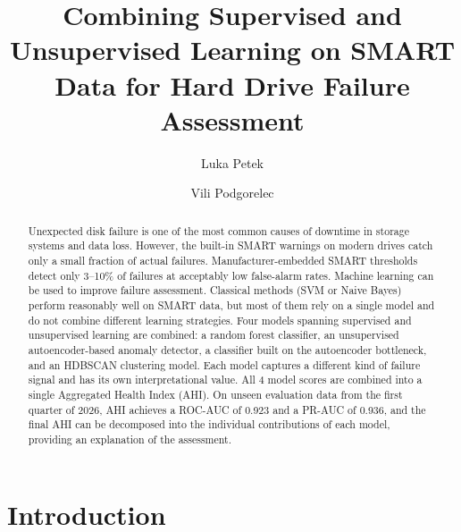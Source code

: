 \documentclass[sigconf,natbib=false]{acmart}
\begin{document}
\title[Combining Supervised and Unsupervised Learning for Hard Drive Failure Assessment]{Combining Supervised and Unsupervised Learning on SMART Data for Hard Drive Failure Assessment}

\author{Luka Petek}

\author{Vili Podgorelec}

\renewcommand{\shortauthors}{Petek and Podgorelec}

\begin{abstract}

Unexpected disk failure is one of the most common causes of downtime in storage systems and data loss. However, the built-in SMART warnings on modern drives catch only a small fraction of actual failures. Manufacturer-embedded SMART thresholds detect only 3--10\% of failures at acceptably low false-alarm rates. Machine learning can be used to improve failure assessment. Classical methods (SVM or Naive Bayes) perform reasonably well on SMART data, but most of them rely on a single model and do not combine different learning strategies. Four models spanning supervised and unsupervised learning are combined: a random forest classifier, an unsupervised autoencoder-based anomaly detector, a classifier built on the autoencoder bottleneck, and an HDBSCAN clustering model. Each model captures a different kind of failure signal and has its own interpretational value. All 4 model scores are combined into a single Aggregated Health Index (AHI). On unseen evaluation data from the first quarter of 2026, AHI achieves a ROC-AUC of 0.923 and a PR-AUC of 0.936, and the final AHI can be decomposed into the individual contributions of each model, providing an explanation of the assessment.
\end{abstract}


\maketitle

\section{Introduction}
\label{sec:introduction}
\end{document}
